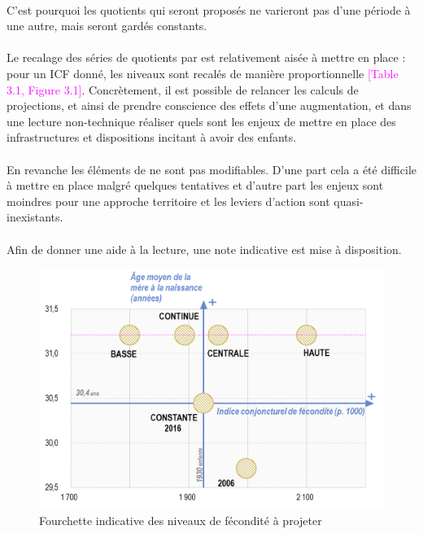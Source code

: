 \documentclass{bredele}
\begin{document}
\\C'est pourquoi les quotients qui seront proposés ne varieront pas d'une période à une autre, mais seront gardés constants.\\\\Le recalage des séries de quotients par est relativement aisée à mettre en place : pour un ICF donné, les niveaux sont recalés de manière proportionnelle \textcolor{magenta}{[Table 3.1, Figure 3.1]}. Concrètement, il est possible de relancer les calculs de projections, et ainsi de prendre conscience des effets d'une augmentation, et dans une lecture non-technique réaliser quels sont les enjeux de mettre en place des infrastructures et dispositions incitant à avoir des enfants.
\\\\En revanche les éléments de  ne sont pas modifiables. D'une part cela a été difficile à mettre en place malgré quelques tentatives et d'autre part les enjeux sont moindres pour une approche territoire et les leviers d'action sont quasi-inexistants.
\\\\Afin de donner une aide à la lecture, une note indicative est mise à disposition.
\begin{figure}\centering
\includegraphics[width=\textwidth]{HYPOFEC}
\caption{Fourchette indicative des niveaux de fécondité à projeter}
\begin{flushright}
\end{flushright}
\end{figure}
\end{document}
